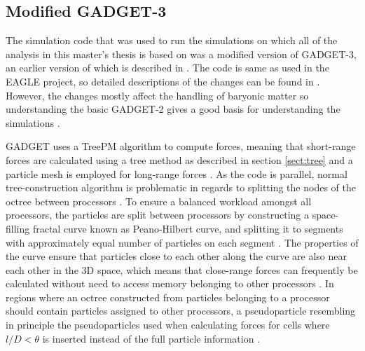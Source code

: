 \documentclass[english, oneside]{HYgradu}
\begin{document}




\subsection{Modified GADGET-3} \label{sect:gadget}
The simulation code that was used to run the simulations on which all of the analysis in this master's thesis is based on was a modified version of GADGET-3, an earlier version of which is described in \citet{springel2005cosmological}. The code is same as used in the EAGLE project, so detailed descriptions of the changes can be found in \citet{schaye2015eagle}. However, the changes mostly affect the handling of baryonic matter so understanding the basic GADGET-2 gives a good basis for understanding the simulations \citep{schaye2015eagle}.

GADGET uses a TreePM algorithm to compute forces, meaning that short-range forces are calculated using a tree method as described in section \ref{sect:tree} and a particle mesh is employed for long-range forces \citep{springel2005cosmological}. As the code is parallel, normal tree-construction algorithm is problematic in regards to splitting the nodes of the octree between processors \citep{springel2005cosmological}. To ensure a balanced workload amongst all processors, the particles are split between processors by constructing a space-filling fractal curve known as Peano-Hilbert curve, and splitting it to segments with approximately equal number of particles on each segment \citep{springel2005cosmological}. The properties of the curve ensure that particles close to each other along the curve are also near each other in the 3D space, which means that close-range forces can frequently be calculated without need to access memory belonging to other processors \citep{springel2005cosmological}. In regions where an octree constructed from particles belonging to a processor should contain particles assigned to other processors, a pseudoparticle resembling in principle the pseudoparticles used when calculating forces for cells where $l/D < \theta$ is inserted instead of the full particle information \citep{springel2005cosmological}.
\end{document}
